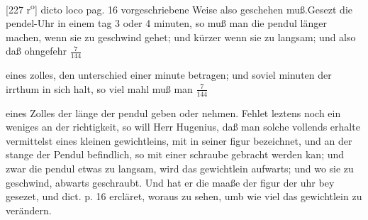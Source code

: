 [227 r\textsuperscript{o}] dicto loco pag. 16 vorgeschriebene Weise also geschehen muß.\pend \pstart Gesezt die pendel-Uhr\protect{}  in einem tag 3 oder 4 minuten, so muß man die pendul\protect{} l\"{a}nger machen, wenn sie zu geschwind gehet; und k\"{u}rzer wenn sie zu langsam; und  also daß ohngefehr $\displaystyle\frac{7}{144}$\rule[-4mm]{0mm}{10mm} eines zolles, den unterschied einer minute betragen; und soviel minuten der irrthum in sich halt, so viel mahl muß man $\displaystyle\frac{7}{144}$\rule[-4mm]{0mm}{10mm} eines Zolles der l\"{a}nge der pendul\protect{} geben oder nehmen. Fehlet leztens noch ein weniges an der richtigkeit, so will Herr Hugenius\protect{}, daß man solche vollends erhalte vermittelst eines kleinen gewichtleins, mit  in seiner figur 
{} bezeichnet, und an der stange der Pendul\protect{} befindlich, so mit einer  schraube   gebracht werden kan; und zwar  die pendul\protect{} etwas zu langsam, wird das gewichtlein aufwarts; und wo sie zu geschwind, abwarts geschraubt. Und hat er die maaße der figur der uhr\protect{}  bey gesezet, und dict. p. 16 ercl\"{a}ret, woraus zu sehen, umb wie viel das gewichtlein zu ver\"{a}ndern.\pend 